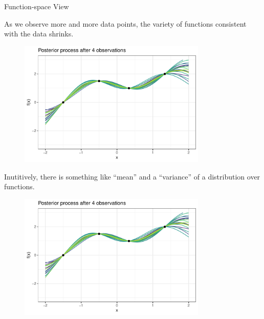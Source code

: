 \begin{vbframe}{Function-space View}
\framebreak 

As we observe more and more data points, the variety of functions consistent with the data shrinks. 
  \begin{figure}
    \includegraphics[width=0.8\textwidth]{figure_man/gp-sample/gp-sample-2-4.pdf}
  \end{figure}

\framebreak 

Inutitively, there is something like \enquote{mean} and a \enquote{variance} of a distribution over functions. 

  \begin{figure}
    \includegraphics[width=0.8\textwidth]{figure_man/gp-sample/gp-sample-2-4.pdf}
  \end{figure}

\end{vbframe}

